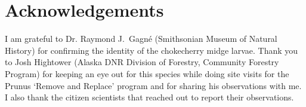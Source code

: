 \section{Acknowledgements}
I am grateful to Dr. Raymond J.\ Gagn\'{e} (Smithsonian Museum of Natural History) for confirming the identity of the chokecherry midge larvae. Thank you to Josh Hightower (Alaska DNR Division of Forestry, Community Forestry Program) for keeping an eye out for this species while doing site visits for the Prunus ‘Remove and Replace’ program and for sharing his observations with me. I also thank the citizen scientists that reached out to report their observations. 

